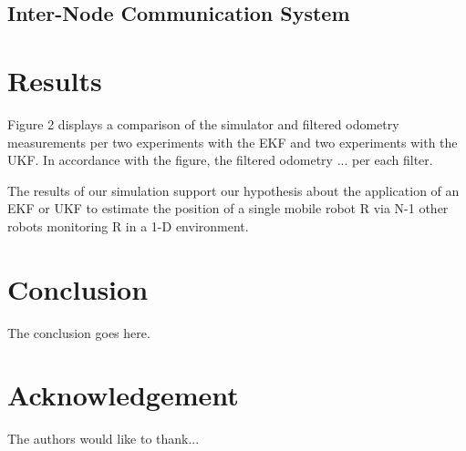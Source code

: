 \documentclass[conference]{IEEEtran}
\begin{document}
\subsection{Inter-Node Communication System}

\section{Results}
Figure 2 displays a comparison of the simulator and filtered odometry measurements per two experiments with the EKF and 
two experiments with the UKF. In accordance with the figure, the filtered odometry ... 
per each filter.

The results of our simulation support our hypothesis about the application of an EKF or UKF to estimate the position of 
a single mobile robot R via N-1 other robots monitoring R in a 1-D environment. 
\section{Conclusion}
The conclusion goes here.

\section*{Acknowledgement}


The authors would like to thank...



%
%
%

\printbibliography




\end{document}
